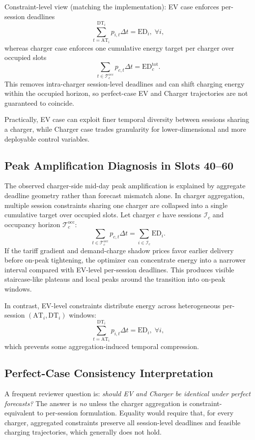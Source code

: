 \documentclass[journal]{IEEEtran}
\newcommand{\AT}{\mathrm{AT}}
\newcommand{\DT}{\mathrm{DT}}
\newcommand{\ED}{\mathrm{ED}}
\begin{document}
Constraint-level view (matching the implementation): EV case enforces per-session deadlines
\begin{equation}
\sum_{t=\AT_i}^{\DT_i}p_{i,t}\Delta t = \ED_i,\;\forall i,
\end{equation}
whereas charger case enforces one cumulative energy target per charger over occupied slots
\begin{equation}
\sum_{t\in\mathcal{T}^{\mathrm{occ}}_c} p_{c,t}\Delta t = \ED^{\mathrm{tot}}_c.
\end{equation}
This removes intra-charger session-level deadlines and can shift charging energy within the occupied horizon, so perfect-case EV and Charger trajectories are not guaranteed to coincide.

Practically, EV case can exploit finer temporal diversity between sessions sharing a charger, while Charger case trades granularity for lower-dimensional and more deployable control variables.

\subsection{Peak Amplification Diagnosis in Slots 40--60}
The observed charger-side mid-day peak amplification is explained by aggregate deadline geometry rather than forecast mismatch alone. In charger aggregation, multiple session constraints sharing one charger are collapsed into a single cumulative target over occupied slots. Let charger $c$ have sessions $\mathcal{I}_c$ and occupancy horizon $\mathcal{T}_c^{\mathrm{occ}}$:
\begin{equation}
\sum_{t\in\mathcal{T}_c^{\mathrm{occ}}}p_{c,t}\Delta t = \sum_{i\in\mathcal{I}_c}\ED_i.
\end{equation}
If the tariff gradient and demand-charge shadow prices favor earlier delivery before on-peak tightening, the optimizer can concentrate energy into a narrower interval compared with EV-level per-session deadlines. This produces visible staircase-like plateaus and local peaks around the transition into on-peak windows.

In contrast, EV-level constraints distribute energy across heterogeneous per-session $(\AT_i,\DT_i)$ windows:
\begin{equation}
\sum_{t=\AT_i}^{\DT_i}p_{i,t}\Delta t = \ED_i,\;\forall i,
\end{equation}
which prevents some aggregation-induced temporal compression.

\subsection{Perfect-Case Consistency Interpretation}
A frequent reviewer question is: \emph{should EV and Charger be identical under perfect forecasts?} The answer is \emph{no} unless the charger aggregation is constraint-equivalent to per-session formulation. Equality would require that, for every charger, aggregated constraints preserve all session-level deadlines and feasible charging trajectories, which generally does not hold.
\end{document}

